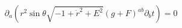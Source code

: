 \begin{equation}
\partial_a
\left( r^2 \sin \theta \sqrt{-1+\dot{r}^2+E^2} (g+F)^{ab}
\partial_b t\right)= 0
\end{equation}

